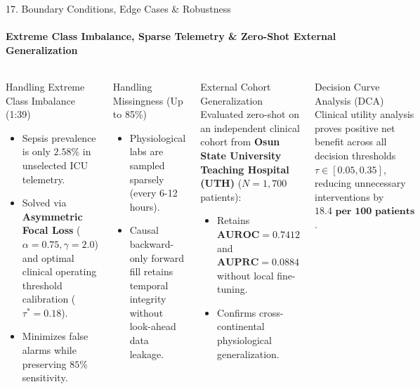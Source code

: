 \documentclass[aspectratio=169, 10pt]{beamer}
\begin{document}
\begin{frame}{17. Boundary Conditions, Edge Cases \& Robustness}
    \framesubtitle{Extreme Class Imbalance, Sparse Telemetry \& Zero-Shot External Generalization}
    \begin{columns}[T]
        \begin{block}{Handling Extreme Class Imbalance (1:39)}
            \scriptsize
            \begin{itemize}
                \item Sepsis prevalence is only $2.58\%$ in unselected ICU telemetry.
                \item Solved via \textbf{Asymmetric Focal Loss} ($\alpha = 0.75, \gamma = 2.0$) and optimal clinical operating threshold calibration ($\tau^* = 0.18$).
                \item Minimizes false alarms while preserving $85\%$ sensitivity.
            \end{itemize}
        \end{block}

        \begin{block}{Handling Missingness (Up to 85\%)}
            \scriptsize
            \begin{itemize}
                \item Physiological labs are sampled sparsely (every 6-12 hours).
                \item Causal backward-only forward fill retains temporal integrity without look-ahead data leakage.
            \end{itemize}
        \end{block}

        \begin{block}{External Cohort Generalization}
            \scriptsize
            Evaluated zero-shot on an independent clinical cohort from \textbf{Osun State University Teaching Hospital (UTH)} ($N = 1,700$ patients):
            \begin{itemize}
                \item Retains $\mathbf{\text{AUROC} = 0.7412}$ and $\mathbf{\text{AUPRC} = 0.0884}$ without local fine-tuning.
                \item Confirms cross-continental physiological generalization.
            \end{itemize}
        \end{block}

        \begin{block}{Decision Curve Analysis (DCA)}
            \scriptsize
            Clinical utility analysis proves positive net benefit across all decision thresholds $\tau \in [0.05, 0.35]$, reducing unnecessary interventions by $\mathbf{18.4\text{ per } 100\text{ patients}}$.
        \end{block}
    \end{columns}
\end{frame}
\end{document}
